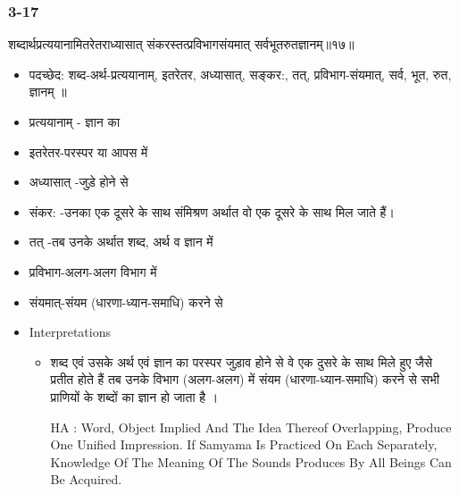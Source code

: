 \begin{frame}[fragile]\frametitle{3-17}
\begin{sanskrit}
शब्दार्थप्रत्ययानामितरेतराध्यासात् संकरस्तत्प्रविभागसंयमात् सर्वभूतरुतज्ञानम्॥१७॥
\end{sanskrit}

	\begin{itemize}
	\item पदच्छेद:  शब्द-अर्थ-प्रत्ययानाम्, इतरेतर, अध्यासात्‌, सङ्कर:, तत्, प्रविभाग-संयमात्, सर्व, भूत, रुत, ज्ञानम् ॥
	\item प्रत्ययानाम् - ज्ञान का
	\item इतरेतर-परस्पर या आपस में
	\item अध्यासात् -जुड़े होने से
	\item संकर: -उनका एक दूसरे के साथ संमिश्रण अर्थात वो एक दूसरे के साथ मिल जाते हैं।
	\item तत् -तब उनके अर्थात शब्द, अर्थ व ज्ञान में
	\item प्रविभाग-अलग-अलग विभाग में
	\item संयमात्-संयम (धारणा-ध्यान-समाधि) करने से	
	\item Interpretations
		\begin{itemize}	
		\item शब्द एवं उसके अर्थ एवं ज्ञान का परस्पर जुड़ाव होने से वे एक दुसरे के साथ मिले हुए जैसे प्रतीत होते हैं तब उनके विभाग (अलग-अलग) में संयम (धारणा-ध्यान-समाधि) करने से सभी प्राणियों के शब्दों का ज्ञान हो जाता है ।
		\item [HA]: Word, Object Implied And The Idea Thereof Overlapping, Produce One Unified Impression. If Samyama Is Practiced On Each Separately, Knowledge Of The Meaning Of The Sounds Produces By All Beings Can Be Acquired.
		\end{itemize}
	\end{itemize}
\end{frame}

